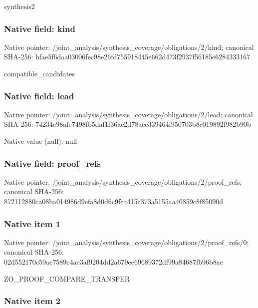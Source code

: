\documentclass[10pt,a4paper]{article}
\begin{document}
synthesis2


\subsubsection{Native field: kind}


Native pointer: /joint\_analysis/synthesi\allowbreak{}s\_coverage/obligations/2\allowbreak{}/kind; canonical SHA-256: bfae5f6daa03006fec98e26f\allowbreak{}d755918445e662d473f2937f\allowbreak{}56185e6284333167


compatible\_candidates


\subsubsection{Native field: lead}


Native pointer: /joint\_analysis/synthesi\allowbreak{}s\_coverage/obligations/2\allowbreak{}/lead; canonical SHA-256: 74234e98afe7498fb5daf1f3\allowbreak{}6ac2d78acc339464f950703b\allowbreak{}8c019892f982b90b



Native value (null): null



\subsubsection{Native field: proof\_refs}


Native pointer: /joint\_analysis/synthesi\allowbreak{}s\_coverage/obligations/2\allowbreak{}/proof\_refs; canonical SHA-256: 872112880ca08ba014986d9e\allowbreak{}fa8d0d6c9fea415c373a5155\allowbreak{}aa40859c8f85090d



\subsubsection{Native item 1}


Native pointer: /joint\_analysis/synthesi\allowbreak{}s\_coverage/obligations/2\allowbreak{}/proof\_refs/0; canonical SHA-256: 02d552170c59ae7589e4ae3a\allowbreak{}f9204dd2a679ee69689372df\allowbreak{}99a84687fb96b8ae


ZO\_PROOF\_COMPARE\_TRANSFER


\subsubsection{Native item 2}
\end{document}

